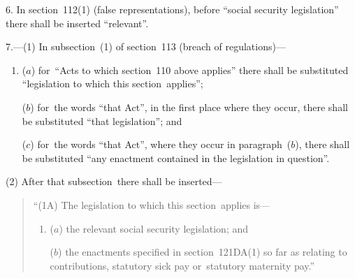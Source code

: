 \documentclass[12pt,a4paper]{article}
\begin{document}
\medskip

6. In section~112(1)  (false representations), before “social security legislation” there shall be inserted “relevant”.

\medskip

7.---(1) In subsection~(1)  of section~113 (breach of regulations)—
\begin{enumerate}\item[]
($a$) for~“Acts to which section~110 above applies” there shall be substituted “legislation to which this section~applies”;

($b$) for~the words “that Act”, in the first place where they occur, there shall be substituted “that legislation”; and

($c$) for~the words “that Act”, where they occur in paragraph~($b$), there shall be substituted “any enactment contained in the legislation in question”.
\end{enumerate}

(2) After that subsection~there shall be inserted—
\begin{quotation}
“(1A) The legislation to which this section~applies is—
\begin{enumerate}\item[]
($a$) the relevant social security legislation; and

($b$) the enactments specified in section~121DA(1)  so far as relating to contributions, statutory sick pay or~statutory maternity pay.”
\end{enumerate}
\end{quotation}

\medskip
\end{document}

